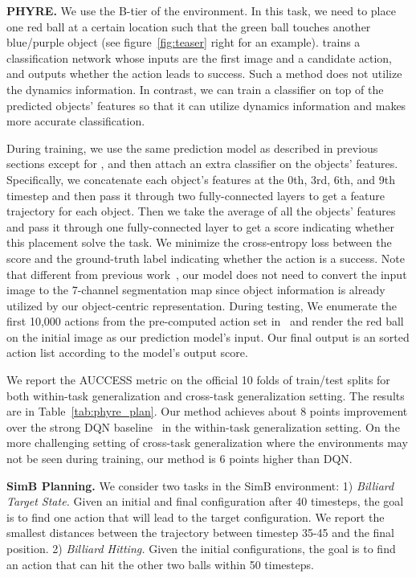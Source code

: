 \documentclass{article} \usepackage{iclr2021_conference,times}
\begin{document}
\textbf{PHYRE.} We use the B-tier of the environment. In this task, we need to place one red ball at a certain location such that the green ball touches another blue/purple object (see figure~\ref{fig:teaser} right for an example). \citet{bakhtin2019phyre} trains a classification network whose inputs are the first image and a candidate action, and outputs whether the action leads to success. Such a method does not utilize the dynamics information. In contrast, we can train a classifier on top of the predicted objects' features so that it can utilize dynamics information and makes more accurate classification.

During training, we use the same prediction model as described in previous sections except for , and then attach an extra classifier on the objects' features. Specifically, we concatenate each object's features at the 0th, 3rd, 6th, and 9th timestep and then pass it through two fully-connected layers to get a feature trajectory for each object. Then we take the average of all the objects' features and pass it through one fully-connected layer to get a score indicating whether this placement solve the task. We minimize the cross-entropy loss between the score and the ground-truth label indicating whether the action is a success. Note that different from previous work~\citep{bakhtin2019phyre,girdhar2020forward}, our model does not need to convert the input image to the 7-channel segmentation map since object information is already utilized by our object-centric representation. During testing, We enumerate the first 10,000 actions from the pre-computed action set in~\citet{bakhtin2019phyre} and render the red ball on the initial image as our prediction model's input. Our final output is an sorted action list according to the model's output score.

We report the AUCCESS metric on the official 10 folds of train/test splits for both within-task generalization and cross-task generalization setting. The results are in Table~\ref{tab:phyre_plan}. Our method achieves about 8 points improvement over the strong DQN baseline~\citep{bakhtin2019phyre} in the within-task generalization setting. On the more challenging setting of cross-task generalization where the environments may not be seen during training, our method is 6 points higher than DQN.

\textbf{SimB Planning.} We consider two tasks in the SimB environment: 1) \textit{Billiard Target State.} Given an initial and final configuration after 40 timesteps, the goal is to find one action that will lead to the target configuration. We report the smallest distances between the trajectory between timestep 35-45 and the final position. 2) \textit{Billiard Hitting.} Given the initial configurations, the goal is to find an action that can hit the other two balls within 50 timesteps. 
\end{document}
